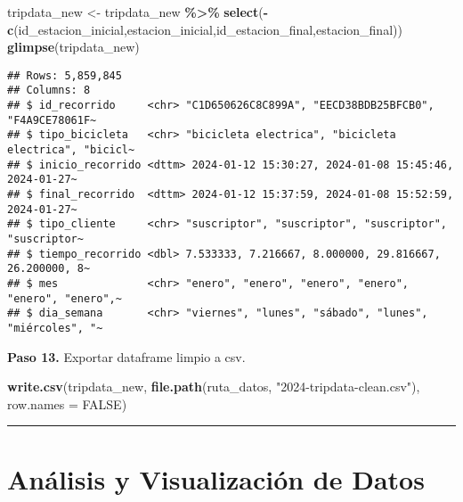 \documentclass[
]{article}
\newenvironment{Shaded}{\begin{snugshade}}{\end{snugshade}}
\newcommand{\AttributeTok}[1]{\textcolor[rgb]{0.13,0.29,0.53}{#1}}
\newcommand{\ConstantTok}[1]{\textcolor[rgb]{0.56,0.35,0.01}{#1}}
\newcommand{\FunctionTok}[1]{\textcolor[rgb]{0.13,0.29,0.53}{\textbf{#1}}}
\newcommand{\NormalTok}[1]{#1}
\newcommand{\OtherTok}[1]{\textcolor[rgb]{0.56,0.35,0.01}{#1}}
\newcommand{\SpecialCharTok}[1]{\textcolor[rgb]{0.81,0.36,0.00}{\textbf{#1}}}
\newcommand{\StringTok}[1]{\textcolor[rgb]{0.31,0.60,0.02}{#1}}
\begin{document}
\begin{Shaded}
\begin{Highlighting}[]
\NormalTok{tripdata\_new }\OtherTok{\textless{}{-}}\NormalTok{ tripdata\_new }\SpecialCharTok{\%\textgreater{}\%} 
  \FunctionTok{select}\NormalTok{(}\SpecialCharTok{{-}}\FunctionTok{c}\NormalTok{(}\StringTok{\textquotesingle{}id\_estacion\_inicial\textquotesingle{}}\NormalTok{,}\StringTok{\textquotesingle{}estacion\_inicial\textquotesingle{}}\NormalTok{,}\StringTok{\textquotesingle{}id\_estacion\_final\textquotesingle{}}\NormalTok{,}\StringTok{\textquotesingle{}estacion\_final\textquotesingle{}}\NormalTok{))}
\FunctionTok{glimpse}\NormalTok{(tripdata\_new)}
\end{Highlighting}
\end{Shaded}

\begin{verbatim}
## Rows: 5,859,845
## Columns: 8
## $ id_recorrido     <chr> "C1D650626C8C899A", "EECD38BDB25BFCB0", "F4A9CE78061F~
## $ tipo_bicicleta   <chr> "bicicleta electrica", "bicicleta electrica", "bicicl~
## $ inicio_recorrido <dttm> 2024-01-12 15:30:27, 2024-01-08 15:45:46, 2024-01-27~
## $ final_recorrido  <dttm> 2024-01-12 15:37:59, 2024-01-08 15:52:59, 2024-01-27~
## $ tipo_cliente     <chr> "suscriptor", "suscriptor", "suscriptor", "suscriptor~
## $ tiempo_recorrido <dbl> 7.533333, 7.216667, 8.000000, 29.816667, 26.200000, 8~
## $ mes              <chr> "enero", "enero", "enero", "enero", "enero", "enero",~
## $ dia_semana       <chr> "viernes", "lunes", "sábado", "lunes", "miércoles", "~
\end{verbatim}

\hfill\break
\textbf{Paso 13.} Exportar dataframe limpio a csv.

\begin{Shaded}
\begin{Highlighting}[]
\FunctionTok{write.csv}\NormalTok{(tripdata\_new, }\FunctionTok{file.path}\NormalTok{(ruta\_datos, }\StringTok{"2024{-}tripdata{-}clean.csv"}\NormalTok{), }\AttributeTok{row.names =} \ConstantTok{FALSE}\NormalTok{)}
\end{Highlighting}
\end{Shaded}

\hfill\break

\begin{center}\rule{0.5\linewidth}{0.5pt}\end{center}

\section{Análisis y Visualización de
Datos}\label{anuxe1lisis-y-visualizaciuxf3n-de-datos}
\end{document}
